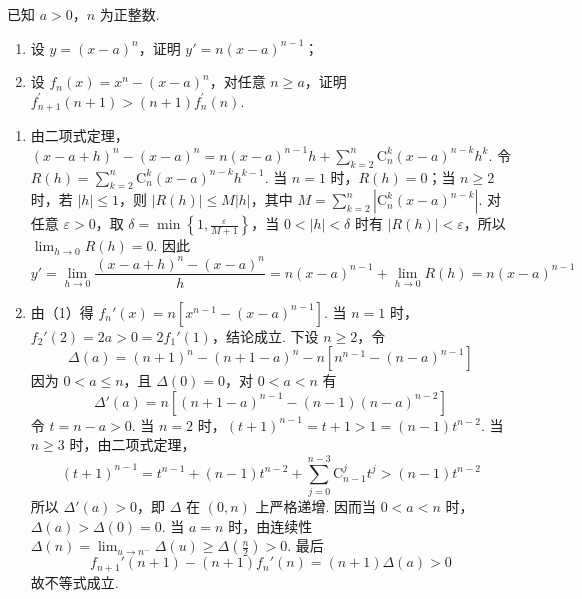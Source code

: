 \begin{problem}
已知 \(a > 0\)，\(n\) 为正整数.

\begin{enumerate}
\item 设 \(y=(x-a)^{n}\)，证明 \(y'=n(x-a)^{n-1}\)；
\item 设 \(f_{n}(x)=x^{n}-(x-a)^{n}\)，对任意 \(n \geq a\)，证明 \(f_{n+1}^{\prime}(n+1) > (n+1)f_{n}^{\prime}(n)\).
\end{enumerate}

\begin{solution}
\begin{enumerate}
\item 由二项式定理，\((x-a+h)^{n}-(x-a)^{n}=n(x-a)^{n-1}h+\sum_{k=2}^{n}\mathrm C_{n}^{k}(x-a)^{n-k}h^{k}\). 令 \(R(h)=\sum_{k=2}^{n}\mathrm C_{n}^{k}(x-a)^{n-k}h^{k-1}\). 当 \(n=1\) 时，\(R(h)=0\)；当 \(n\geq2\) 时，若 \(|h|\leq1\)，则 \(|R(h)|\leq M|h|\)，其中 \(M=\sum_{k=2}^{n}\left|\mathrm C_{n}^{k}(x-a)^{n-k}\right|\). 对任意 \(\varepsilon>0\)，取 \(\delta=\min\left\{1,\frac{\varepsilon}{M+1}\right\}\)，当 \(0<|h|<\delta\) 时有 \(|R(h)|<\varepsilon\)，所以 \(\lim_{h\to0}R(h)=0\). 因此
\[y'=\lim_{h\to0}\frac{(x-a+h)^{n}-(x-a)^{n}}{h}=n(x-a)^{n-1}+\lim_{h\to0}R(h)=n(x-a)^{n-1}\]
\item 由（1）得 \(f_{n}'(x)=n\left[x^{n-1}-(x-a)^{n-1}\right]\). 当 \(n=1\) 时，\(f_{2}'(2)=2a>0=2f_{1}'(1)\)，结论成立. 下设 \(n\geq2\)，令
\[\Delta(a)=(n+1)^{n}-(n+1-a)^{n}-n\left[n^{n-1}-(n-a)^{n-1}\right]\]
因为 \(0<a\leq n\)，且 \(\Delta(0)=0\)，对 \(0<a<n\) 有
\[\Delta'(a)=n\left[(n+1-a)^{n-1}-(n-1)(n-a)^{n-2}\right]\]
令 \(t=n-a>0\). 当 \(n=2\) 时，\((t+1)^{n-1}=t+1>1=(n-1)t^{n-2}\). 当 \(n\geq3\) 时，由二项式定理，
\[(t+1)^{n-1}=t^{n-1}+(n-1)t^{n-2}+\sum_{j=0}^{n-3}\mathrm C_{n-1}^{j}t^{j}>(n-1)t^{n-2}\]
所以 \(\Delta'(a)>0\)，即 \(\Delta\) 在 \((0,n)\) 上严格递增. 因而当 \(0<a<n\) 时，\(\Delta(a)>\Delta(0)=0\). 当 \(a=n\) 时，由连续性
\(\Delta(n)=\lim_{u\to n^-}\Delta(u)\geq\Delta\left(\frac{n}{2}\right)>0\).
最后
\[f_{n+1}'(n+1)-(n+1)f_{n}'(n)=(n+1)\Delta(a)>0\]
故不等式成立.
\end{enumerate}
\end{solution}
\end{problem}
